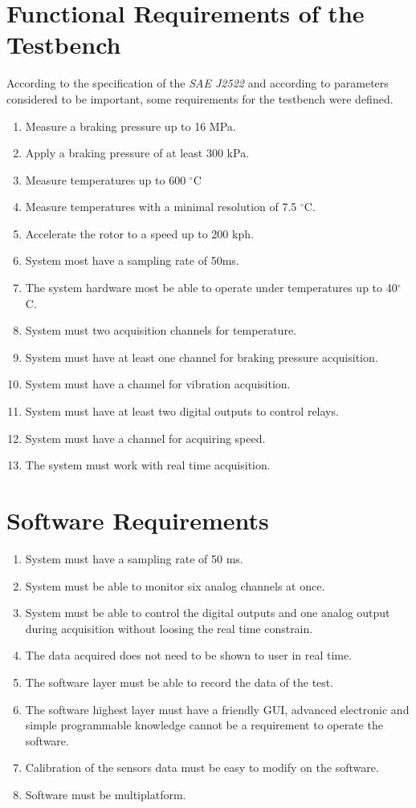 \section{Functional Requirements of the Testbench}\label{sec:functionalRequirements}

	According to the specification of the \textit{SAE J2522} and according to parameters considered to be important, some requirements for the testbench were defined.

	\begin{enumerate}
		\item Measure a braking pressure up to 16 MPa.
		\item Apply a braking pressure of at least 300 kPa.
		\item Measure temperatures up to 600 $^{\circ}$C
		\item Measure temperatures with a minimal resolution of 7.5 $^{\circ}$C.
		\item Accelerate the rotor to a speed up to 200 kph.
		\item System most have a sampling rate of 50ms.
		\item The system hardware most be able to operate under temperatures up to 40$^{\circ}$C.
		\item System must two acquisition channels for temperature.
		\item System must have at least one channel for braking pressure acquisition.
		\item System must have a channel for vibration acquisition.
		\item System must have at least two digital outputs to control relays.
		\item System must have a channel for acquiring speed.
		\item The system must work with real time acquisition.
	\end{enumerate}
	
\section{Software Requirements}
	
	\begin{enumerate}
		\item System must have a sampling rate of 50 ms.
		\item System must be able to monitor six analog channels at once.
		\item System must be able to control the digital outputs and one analog output during acquisition without loosing the real time constrain.
		\item The data acquired does not need to be shown to user in real time.
		\item The software layer must be able to record the data of the test.
		\item The software highest layer must have a friendly GUI, advanced electronic and simple programmable knowledge cannot be a requirement to operate the software.
		\item Calibration of the sensors data must be easy to modify on the software.
		\item Software must be multiplatform.
	\end{enumerate}
